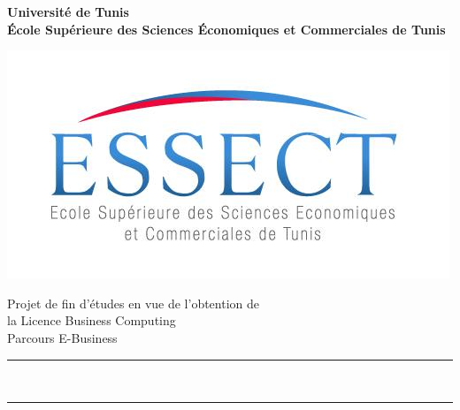 

\thispagestyle{empty}
    
    
\begin{center}
\textbf{Université de Tunis} \\ 

\textbf{École Supérieure des Sciences Économiques et Commerciales de Tunis}

\vspace{0.9cm} 
\includegraphics[width=0.4 \columnwidth]{chap1.images/logoessect.jpg}
\vspace{0.9cm} 

Projet de fin d'études en vue de l'obtention de \\la Licence Business Computing \\ Parcours E-Business


  

\vspace{2cm}
{\hrule height 1pt} %
\vspace{0.5cm}
\\ \par
{\hrule height 1pt} %
\par
\vspace{2cm}



\end{center}
